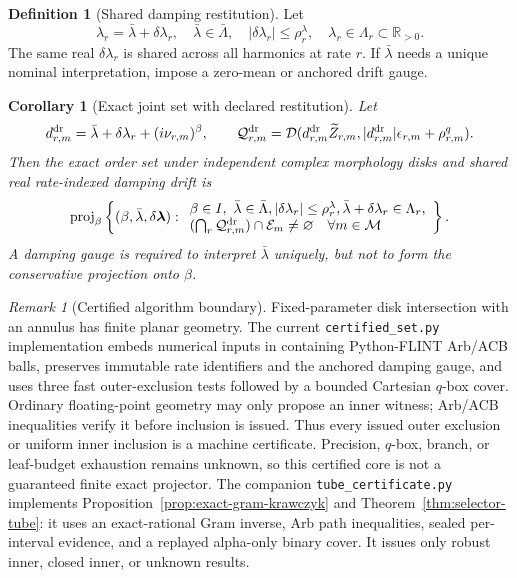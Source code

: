 \documentclass[11pt]{article}
\newtheorem{corollary}[theorem]{Corollary}
\theoremstyle{definition}
\newtheorem{definition}[theorem]{Definition}
\theoremstyle{remark}
\newtheorem{remark}[theorem]{Remark}
\newcommand{\R}{\mathbb R}
\newcommand{\Eset}{\mathcal E}
\newcommand{\Mset}{\mathcal M}
\newcommand{\proj}{\operatorname{proj}}
\begin{document}
\begin{definition}[Shared damping restitution]
Let
\[
 \lambda_r=\bar\lambda+\delta\lambda_r,\quad
 \bar\lambda\in\bar\Lambda,\quad
 |\delta\lambda_r|\le\rho^\lambda_r,\quad
 \lambda_r\in\Lambda_r\subset\R_{>0}.
\]
The same real \(\delta\lambda_r\) is shared across all harmonics at rate \(r\).
If \(\bar\lambda\) needs a unique nominal interpretation, impose a zero-mean
or anchored drift gauge.
\end{definition}

\begin{corollary}[Exact joint set with declared restitution]
Let
\[
 d^{\rm dr}_{r,m}
 =\bar\lambda+\delta\lambda_r+(i\nu_{r,m})^\beta,\qquad
 \mathcal Q^{\rm dr}_{r,m}
 =\mathcal D(d^{\rm dr}_{r,m}\widetilde Z_{r,m},
 |d^{\rm dr}_{r,m}|\epsilon_{r,m}+\rho^q_{r,m}).
\]
Then the exact order set under independent complex morphology disks and shared
real rate-indexed damping drift is
\[
 \proj_\beta\left\{(\beta,\bar\lambda,\delta\boldsymbol\lambda):
 \begin{array}{l}
 \beta\in I,\ \bar\lambda\in\bar\Lambda,
 |\delta\lambda_r|\le\rho^\lambda_r,
 \bar\lambda+\delta\lambda_r\in\Lambda_r,\\
 (\bigcap_r\mathcal Q^{\rm dr}_{r,m})\cap\Eset_m
 \ne\varnothing\quad\forall m\in\Mset
 \end{array}\right\}.
\]
A damping gauge is required to interpret \(\bar\lambda\) uniquely, but not to
form the conservative projection onto \(\beta\).
\end{corollary}

\begin{remark}[Certified algorithm boundary]
Fixed-parameter disk intersection with an annulus has finite planar geometry.
The current \texttt{certified\_set.py} implementation embeds numerical inputs
in containing Python-FLINT Arb/ACB balls, preserves immutable rate identifiers
and the anchored damping gauge, and uses three fast outer-exclusion tests
followed by a bounded Cartesian \(q\)-box cover.  Ordinary floating-point
geometry may only propose an inner witness; Arb/ACB inequalities verify it
before inclusion is issued.  Thus every issued outer exclusion or uniform
inner inclusion is a machine certificate.  Precision, \(q\)-box, branch, or
leaf-budget exhaustion remains unknown, so this certified core is not a
guaranteed finite exact projector.  The companion
\texttt{tube\_certificate.py} implements
Proposition~\ref{prop:exact-gram-krawczyk} and
Theorem~\ref{thm:selector-tube}: it uses an exact-rational Gram inverse,
Arb path inequalities, sealed per-interval evidence, and a replayed
alpha-only binary cover.  It issues only robust inner, closed inner, or
unknown results.
\end{remark}
\end{document}
